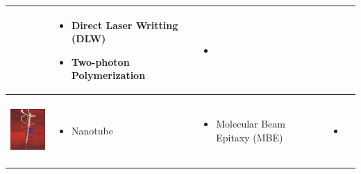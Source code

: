 \documentclass[12pt,a4paper,titlepage]{report}
\begin{document}
\begin{table}[h!]
\begin{tabular}{ c  m{3cm}  m{4.3cm} m{3cm} }
\begin{itemize}
      \end{itemize}
    & 
      \begin{itemize}
        \item Direct Laser Writting (DLW)
	\item Two-photon Polymerization
   
      \end{itemize}
&
	   \begin{itemize}
        \item \citep{peyer2013bio}
   
      \end{itemize}
    \\ \hline

 \begin{minipage}{.3\textwidth}
      \includegraphics[width=\linewidth, height=25mm]{tube_ta}
    \end{minipage}
    &
      \begin{itemize}
        \item Nanotube
        
      \end{itemize}
    & 
      \begin{itemize}
        \item Molecular Beam Epitaxy (MBE)
	   
	   
    
      \end{itemize}
	&
	   \begin{itemize}
        \item \citep{C2NR32798H}
   
      \end{itemize}
    \\ \hline



\end{tabular}
\end{table}
\end{document}
